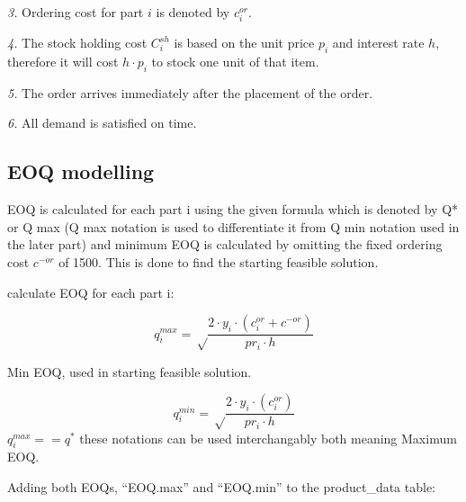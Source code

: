 \documentclass[
]{article}
\begin{document}
\emph{3.} Ordering cost for part \(i\) is denoted by \(c_i^{or}\).

\emph{4.} The stock holding cost \(C_i^{sh}\) is based on the unit price
\(p_i\) and interest rate \(h\), therefore it will cost \(h \cdot p_i\)
to stock one unit of that item.

\emph{5. } The order arrives immediately after the placement of the
order.

\emph{6. } All demand is satisfied on time.

\hypertarget{eoq-modelling}{%
\subsection{EOQ modelling}\label{eoq-modelling}}

EOQ is calculated for each part i using the given formula which is
denoted by Q* or Q max (Q max notation is used to differentiate it from
Q min notation used in the later part) and minimum EOQ is calculated by
omitting the fixed ordering cost \(c^{-or}\) of 1500. This is done to
find the starting feasible solution.

calculate EOQ for each part i:

\[ q_i^{max} = \sqrt \frac{2 \cdot y_i \cdot (c_i^{or}+c^{-or})}{pr_i \cdot h}\]

Min EOQ, used in starting feasible solution.

\[ q_i^{min} = \sqrt \frac{2 \cdot y_i \cdot (c_i^{or})} {pr_i \cdot h}\]
\(q_i^{max}== q^*\) these notations can be used interchangably both
meaning Maximum EOQ.

Adding both EOQs, ``EOQ.max'' and ``EOQ.min'' to the product\_data
table:
\end{document}
